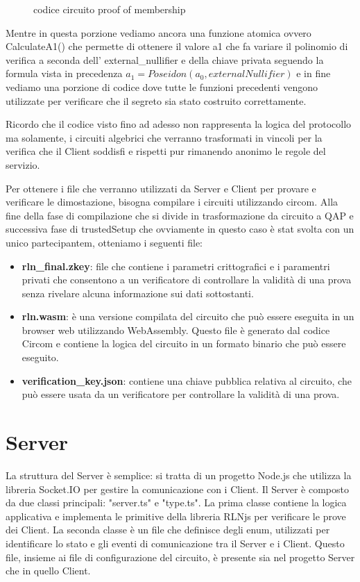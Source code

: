 \begin{enumerate}
\begin{figure}[H]
        \label{fig:2.verify_shares}
        \captionsetup{justification=centering}
        \caption{codice circuito proof of membership}
    \end{figure}
    Mentre in questa porzione vediamo ancora una funzione atomica ovvero CalculateA1() che permette di ottenere il valore a1 che fa variare il polinomio di verifica a seconda dell' external\_nullifier e della chiave privata seguendo la formula vista in precedenza $a_1 = Poseidon(a_0, externalNullifier)$ e in fine vediamo una porzione di codice dove tutte le funzioni precedenti vengono utilizzate per verificare che il segreto sia stato costruito correttamente.
\end{enumerate}

Ricordo che il codice visto fino ad adesso non rappresenta la logica del protocollo ma solamente, i circuiti algebrici che verranno trasformati in vincoli per la verifica che il Client soddisfi e rispetti pur rimanendo anonimo le regole del servizio.

Per ottenere i file che verranno utilizzati da Server e Client per provare e verificare le dimostazione, bisogna compilare i circuiti utilizzando circom. Alla fine della fase di compilazione che si divide in trasformazione da circuito a QAP e successiva fase di trustedSetup che ovviamente in questo caso è stat svolta con un unico partecipantem, otteniamo i seguenti file:
\begin{itemize}
    \item \textbf{rln\_final.zkey}: file che contiene i parametri crittografici e i paramentri privati che consentono a un verificatore di controllare la validità di una prova senza rivelare alcuna informazione sui dati sottostanti.
    \item \textbf{rln.wasm}: è una versione compilata del circuito che può essere eseguita in un browser web utilizzando WebAssembly. Questo file è generato dal codice Circom e contiene la logica del circuito in un formato binario che può essere eseguito.
    \item \textbf{verification\_key.json}: contiene una chiave pubblica relativa al circuito, che può essere usata da un verificatore per controllare la validità di una prova.
\end{itemize}

\section{Server}
La struttura del Server è semplice: si tratta di un progetto Node.js che utilizza la libreria Socket.IO per gestire la comunicazione con i Client. Il Server è composto da due classi principali: "server.ts" e "type.ts". La prima classe contiene la logica applicativa e implementa le primitive della libreria RLNjs per verificare le prove dei Client. La seconda classe è un file che definisce degli enum, utilizzati per identificare lo stato e gli eventi di comunicazione tra il Server e i Client. Questo file, insieme ai file di configurazione del circuito, è presente sia nel progetto Server che in quello Client.

